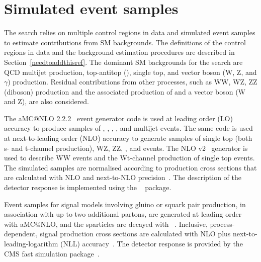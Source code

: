 \section{Simulated event samples}
\label{sec:simulation}

The search relies on multiple control regions in data and simulated
event samples to estimate contributions from SM backgrounds. The
definitions of the control regions in data and the background
estimation procedures are described in
Section~\ref{needtoaddthisref}. The dominant SM backgrounds for the
search are QCD multijet production, top-antitop (\ttbar), single top,
and vector boson (W, Z, and $\gamma$) production. Residual
contributions from other processes, such as WW, WZ, ZZ (diboson)
production and the associated production of \ttbar and a vector boson
(W and Z), are also considered.

The  aMC@NLO 2.2.2~\cite{Alwall2014} event generator code is
used at leading order (LO) accuracy to produce samples of \wj, \zj,
\gj, \ttbar, and multijet events. The same code is used at
next-to-leading order (NLO) accuracy to generate samples of single top
(both s- and t-channel production), WZ, ZZ, \ttw, and \ttz events. The
NLO \POWHEG v2~\cite{powheg, powheg_top_Wt} generator is used to
describe WW events and the Wt-channel production of single top
events. The simulated samples are normalised according to production
cross sections that are calculated with NLO and next-to-NLO
precision~\cite{Alwall2014, wphys, fewz, wwxs, top++, nlotop,
  powheg_top_Wt}. The description of the detector response is
implemented using the \GEANTfour~\cite{geant} package.

Event samples for signal models involving gluino or squark pair
production, in association with up to two additional partons, are
generated at leading order with  aMC@NLO, and the sparticles
are decayed with ~\cite{pythia}. Inclusive, process-dependent,
signal production cross sections are calculated with NLO plus
next-to-leading-logarithm (NLL) accuracy~\cite{Beenakker:1996ch,
  PhysRevLett.102.111802, PhysRevD.80.095004, 1126-6708-2009-12-041,
  doi:10.1142/S0217751X11053560, susynlo}. The detector response is
provided by the CMS fast simulation package~\cite{fastsim}.



